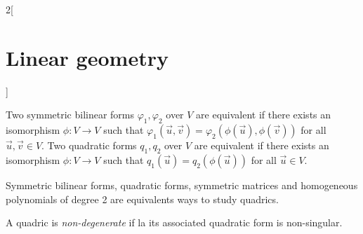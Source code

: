 \documentclass[class=article,10pt,crop=false]{standalone}
\begin{document}
\begin{multicols}{2}[\section{Linear geometry}]
\begin{prop}
Two symmetric bilinear forms $\varphi_1,\varphi_2$ over $V$ are equivalent if there exists an isomorphism $\phi:V\rightarrow V$ such that $\varphi_1(\overrightarrow{u},\overrightarrow{v})=\varphi_2(\phi(\overrightarrow{u}),\phi(\overrightarrow{v}))$ for all $\overrightarrow{u},\overrightarrow{v}\in V$.\newline
Two quadratic forms $q_1,q_2$ over $V$ are equivalent if there exists an isomorphism $\phi:V\rightarrow V$ such that $q_1(\overrightarrow{u})=q_2(\phi(\overrightarrow{u}))$ for all $\overrightarrow{u}\in V$. 
\end{prop}
\begin{theorem}
Symmetric bilinear forms, quadratic forms, symmetric matrices and homogeneous polynomials of degree 2 are equivalents ways to study quadrics.
\end{theorem}
\begin{definition}
A quadric is \textit{non-degenerate} if la its associated quadratic form is non-singular.
\end{definition}

\end{multicols}
\end{document}

